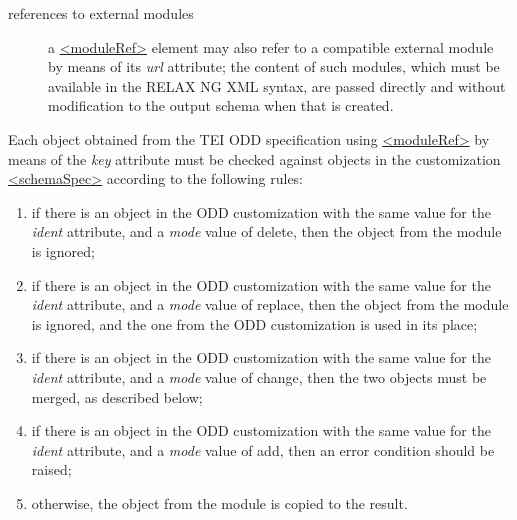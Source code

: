 \begin{description}
\item[{references to external modules}]a \hyperref[TEI.moduleRef]{<moduleRef>} element may also refer to a compatible external module by means of its {\itshape url} attribute; the content of such modules, which must be available in the RELAX NG XML syntax, are passed directly and without modification to the output schema when that is created.
\end{description} \par
Each object obtained from the TEI ODD specification using \hyperref[TEI.moduleRef]{<moduleRef>} by means of the {\itshape key} attribute must be checked against objects in the customization \hyperref[TEI.schemaSpec]{<schemaSpec>} according to the following rules: \begin{enumerate}
\item if there is an object in the ODD customization with the same value for the {\itshape ident} attribute, and a {\itshape mode} value of delete, then the object from the module is ignored;
\item if there is an object in the ODD customization with the same value for the {\itshape ident} attribute, and a {\itshape mode} value of replace, then the object from the module is ignored, and the one from the ODD customization is used in its place;
\item if there is an object in the ODD customization with the same value for the {\itshape ident} attribute, and a {\itshape mode} value of change, then the two objects must be merged, as described below;
\item if there is an object in the ODD customization with the same value for the {\itshape ident} attribute, and a {\itshape mode} value of add, then an error condition should be raised;
\item otherwise, the object from the module is copied to the result.
\end{enumerate}\par
